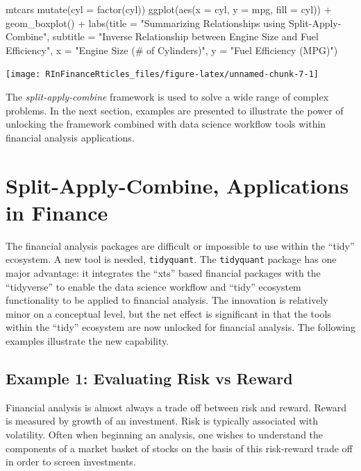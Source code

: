 \begin{Schunk}
\begin{Sinput}
mtcars %
    mutate(cyl = factor(cyl)) %
    ggplot(aes(x = cyl, y = mpg, fill = cyl)) +
    geom_boxplot() +
    labs(title = "Summarizing Relationships using Split-Apply-Combine",
         subtitle = "Inverse Relationship between Engine Size and Fuel Efficiency",
         x = "Engine Size (# of Cylinders)",
         y = "Fuel Efficiency (MPG)")
\end{Sinput}


\begin{center}\texttt{[image: RInFinanceRticles\_files/figure-latex/unnamed-chunk-7-1]} \end{center}

\end{Schunk}

The \emph{split-apply-combine} framework is used to solve a wide range
of complex problems. In the next section, examples are presented to
illustrate the power of unlocking the framework combined with data
science workflow tools within financial analysis applications.

\section{Split-Apply-Combine, Applications in
Finance}\label{split-apply-combine-applications-in-finance}

The financial analysis packages are difficult or impossible to use
within the ``tidy'' ecosystem. A new tool is needed, \texttt{tidyquant}.
The \texttt{tidyquant} package has one major advantage: it integrates
the ``xts'' based financial packages with the ``tidyverse'' to enable
the data science workflow and ``tidy'' ecosystem functionality to be
applied to financial analysis. The innovation is relatively minor on a
conceptual level, but the net effect is significant in that the tools
within the ``tidy'' ecosystem are now unlocked for financial analysis.
The following examples illustrate the new capability.

\subsection{Example 1: Evaluating Risk vs
Reward}\label{example-1-evaluating-risk-vs-reward}

Financial analysis is almost always a trade off between risk and reward.
Reward is measured by growth of an investment. Risk is typically
associated with volatility. Often when beginning an analysis, one wishes
to understand the components of a market basket of stocks on the basis
of this risk-reward trade off in order to screen investments.


